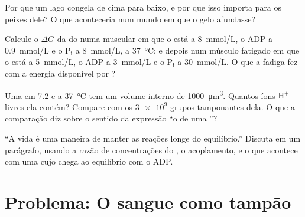 \begin{exercise}[$\star\star$]\label{exo:b1:water-small-molecules:9}
Por que um lago congela de cima para baixo, e por que isso importa para
os peixes dele? O que aconteceria num mundo em que o gelo afundasse?
\end{exercise}

\begin{exercise}[$\star\star\star$]\label{exo:b1:water-small-molecules:10}
Calcule o $\Delta G$ da  do  numa  muscular em que o
 está a \qty{8}{mmol/L}, o ADP a \qty{0.9}{mmol/L} e o
$\mathrm{P_i}$ a \qty{8}{mmol/L}, a \qty{37}{\celsius}; e depois num
músculo fatigado em que o  está a \qty{5}{mmol/L}, o ADP a
\qty{3}{mmol/L} e o $\mathrm{P_i}$ a \qty{30}{mmol/L}. O que a fadiga
fez com a energia disponível por ?
\end{exercise}

\begin{exercise}[$\star\star\star$]\label{exo:b1:water-small-molecules:11}
Uma  em  7.2 e a \qty{37}{\celsius} tem um volume interno de
\qty{1000}{\micro m^3}. Quantos íons $\mathrm{H^+}$ livres ela contém?
Compare com os $\num{3e9}$ grupos tamponantes dela. O que a comparação
diz sobre o sentido da expressão ``o  de uma ''?
\end{exercise}

\begin{exercise}[$\star\star\star$]\label{exo:b1:water-small-molecules:12}
``A vida é uma maneira de manter as reações longe do equilíbrio.''
Discuta em um parágrafo, usando a razão de concentrações do , o
acoplamento, e o que acontece com uma  cujo  chega ao
equilíbrio com o ADP.
\end{exercise}

\section{Problema: O sangue como tampão}

